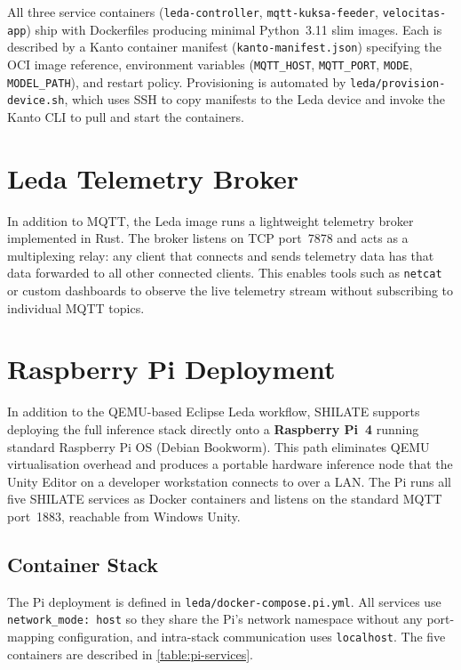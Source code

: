 All three service containers (\texttt{leda-controller},
\texttt{mqtt-kuksa-feeder}, \texttt{velocitas-app}) ship with Dockerfiles
producing minimal Python~3.11 slim images. Each is described by a Kanto
container manifest (\texttt{kanto-manifest.json}) specifying the OCI
image reference, environment variables
(\texttt{MQTT\_HOST}, \texttt{MQTT\_PORT}, \texttt{MODE},
\texttt{MODEL\_PATH}), and restart policy. Provisioning is automated by
\texttt{leda/provision-device.sh}, which uses SSH to copy manifests to
the Leda device and invoke the Kanto CLI to pull and start the
containers.

\section{Leda Telemetry Broker}
\label{sec:telemetry-broker}

In addition to MQTT, the Leda image runs a lightweight telemetry broker
implemented in Rust. The broker listens on TCP port~7878 and acts as a
multiplexing relay: any client that connects and sends telemetry data has
that data forwarded to all other connected clients. This enables tools
such as \texttt{netcat} or custom dashboards to observe the live
telemetry stream without subscribing to individual MQTT topics.

\section{Raspberry Pi Deployment}
\label{sec:pi-deploy}

In addition to the QEMU-based Eclipse Leda workflow, SHILATE supports
deploying the full inference stack directly onto a \textbf{Raspberry
Pi~4} running standard Raspberry Pi OS (Debian Bookworm). This path
eliminates QEMU virtualisation overhead and produces a portable hardware
inference node that the Unity Editor on a developer workstation connects
to over a LAN. The Pi runs all five SHILATE services as Docker containers
and listens on the standard MQTT port~1883, reachable from Windows Unity.

\subsection{Container Stack}
\label{sec:pi-stack}

The Pi deployment is defined in \texttt{leda/docker-compose.pi.yml}. All
services use \texttt{network\_mode: host} so they share the Pi's network
namespace without any port-mapping configuration, and intra-stack
communication uses \texttt{localhost}. The five containers are described
in \cref{table:pi-services}.

